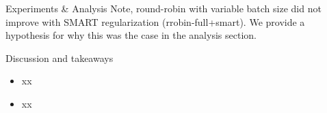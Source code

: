 \documentclass[final]{beamer}
\newlength{\sepwidth}
\newlength{\colwidth}
\newcommand{\separatorcolumn}{\begin{column}{\sepwidth}\end{column}}
\begin{document}
\begin{frame}[t]
\begin{columns}[t]
\begin{column}{\colwidth}
\begin{block}{Experiments \& Analysis}
Note, round-robin with variable batch size did not improve with SMART regularization (rrobin-full+smart). We provide a hypothesis for why this was the case in the analysis section.
\end{block}
    \begin{alertblock}{\small Discussion and takeaways}

    \begin{itemize}
    \item xx
    \item xx
    
    \end{itemize}
  \end{alertblock}

\end{column}

\separatorcolumn
\end{columns}
\vfill
\begin{block}

    \footnotesize{}

\end{block}

\end{frame}
\end{document}
